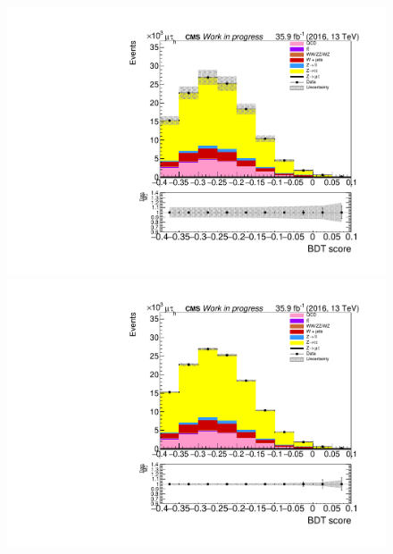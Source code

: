 \begin{figure}[htp]
	\begin{multicols}{2}
		\includegraphics[width=\linewidth]{plots/mt/DY_CR_prefit.pdf}\par 
		\includegraphics[width=\linewidth]{plots/mt/DY_CR_postfit.pdf}\par
	\end{multicols}

\end{figure}

